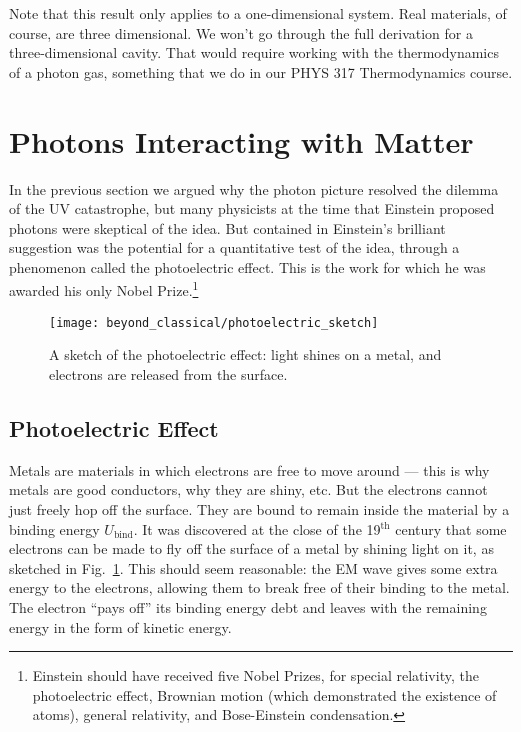 Note that this result only applies to a one-dimensional system. 
Real materials, of course, are three dimensional.  We won't go through
the full derivation for a three-dimensional cavity.  That would require
working with the thermodynamics of a photon gas, something
that we do in our PHYS 317 Thermodynamics course.  

\section{Photons Interacting with Matter}
\label{sec:photons_interacting_matter}

In the previous section we argued why the photon picture resolved the
dilemma of the UV catastrophe,  but many physicists at the time that
Einstein proposed photons were skeptical of the idea.  But contained
in Einstein's brilliant suggestion was the potential for a quantitative
test of the idea, through a phenomenon called the photoelectric effect.  
This is the work for which he was awarded his only Nobel 
Prize.\footnote{Einstein
  should have received five Nobel Prizes, for special relativity, the
  photoelectric effect, Brownian motion (which demonstrated the
  existence of atoms), general relativity, and Bose-Einstein
  condensation.}

\begin{figure}
\begin{center}
\texttt{[image: beyond\_classical/photoelectric\_sketch]}
\caption{A sketch of the photoelectric effect: light shines on a metal,
and electrons are released from the surface.}
\label{fig:photoelectric_sketch}
\end{center}
\end{figure}

\subsection{Photoelectric Effect}

Metals are materials in which electrons are free to move around ---
this is why metals are good conductors, why they are shiny, etc. But
the electrons cannot just freely hop off the surface.  They are bound
to remain inside the material by a binding energy $U_\text{bind}$.
It was discovered at the close of the 19$^\text{th}$ century that some
electrons can be made to fly off the surface of a metal by shining light
on it, as sketched in Fig.~\ref{fig:photoelectric_sketch}.  This should
seem reasonable: the EM wave gives some extra energy to the electrons,
allowing them to break free of their binding to the metal.  The electron
``pays off'' its binding energy debt and leaves with the remaining energy
in the form of kinetic energy.

